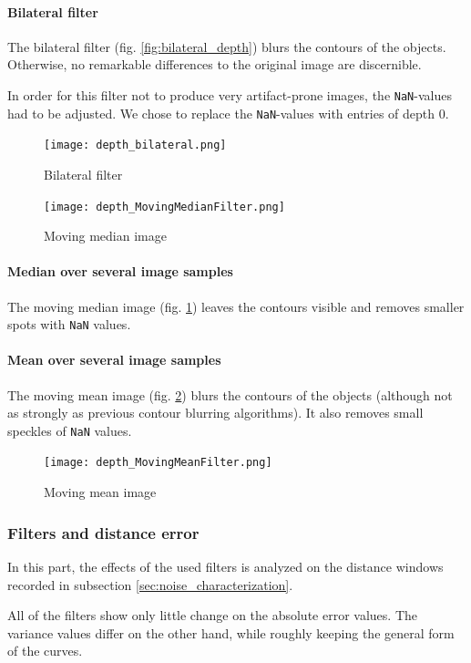 \documentclass[DIV12,a4paper]{scrartcl}
\begin{document}
\paragraph{Bilateral filter}
The bilateral filter (fig. \ref{fig:bilateral_depth}) blurs the contours of the objects. Otherwise, no remarkable differences to the original image are discernible.\par
In order for this filter not to produce very artifact-prone images, the \texttt{NaN}-values had to be adjusted. We chose to replace the \texttt{NaN}-values with entries of depth 0.
\begin{figure}[h!tbp]
  \begin{minipage}{.5\textwidth}
    \centering
    \texttt{[image: depth\_bilateral.png]}
    \caption{Bilateral filter}
    \label{fig:bilateral_depth}
  \end{minipage}%
  \begin{minipage}{.5\textwidth}
    \centering
    \texttt{[image: depth\_MovingMedianFilter.png]}
    \caption{Moving median image}
    \label{fig:moving_median_depth}
  \end{minipage}
\end{figure}
\paragraph{Median over several image samples}
The moving median image (fig. \ref{fig:moving_median_depth}) leaves the contours visible and removes smaller spots with \texttt{NaN} values.
\paragraph{Mean over several image samples}
The moving mean image (fig. \ref{fig:moving_mean_depth}) blurs the contours of the objects (although not as strongly as previous contour blurring algorithms). It also removes small speckles of \texttt{NaN} values.
\begin{figure}[h!tbp]
  \centering
  \texttt{[image: depth\_MovingMeanFilter.png]}
  \caption{Moving mean image}
  \label{fig:moving_mean_depth}
\end{figure}

\newpage
\subsubsection{Filters and distance error}
\label{sec:filters_distance_error}
In this part, the effects of the used filters is analyzed on the distance windows recorded in subsection \ref{sec:noise_characterization}. 
\par
All of the filters show only little change on the absolute error values. The variance values differ on the other hand, while roughly keeping the general form of the curves.
\end{document}
